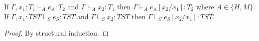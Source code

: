 \begin{lemma}
\label{tms}
If $\Gamma,x_{1}:T_{1}\vdash_{A}e_{A}:T_{2}$ and $\Gamma\vdash_{A}x_{2}:T_{1}$ then $\Gamma\vdash_{A}e_{A}[x_{2}/x_{1}]:T_{2}$ where $A\in\lbrace H,M\rbrace$.  If $\Gamma,x_{1}:TST\vdash_{S}e_{S}:TST$ and $\Gamma\vdash_{S}x_{2}:TST$ then $\Gamma\vdash_{S}e_{S}[x_{2}/x_{1}]:TST$.
\begin{proof}
By structural induction.
\end{proof}
\end{lemma}